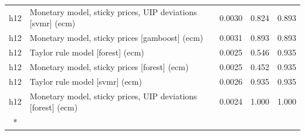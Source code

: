 \begin{ThreePartTable}
\begin{longtable}[t]{cp{5.5cm}ccc}
h12 & \raggedright Monetary model, sticky prices, UIP deviations [svmr] (ecm) & 0.0030 & 0.824 & 0.893\\
h12 & \raggedright Monetary model, sticky prices [gamboost] (ecm) & 0.0031 & 0.893 & 0.893\\
h12 & \raggedright Taylor rule model [forest] (ecm) & 0.0025 & 0.546 & 0.935\\
h12 & \raggedright Monetary model, sticky prices [forest] (ecm) & 0.0025 & 0.452 & 0.935\\
h12 & \raggedright Taylor rule model [svmr] (ecm) & 0.0026 & 0.935 & 0.935\\
h12 & \raggedright Monetary model, sticky prices, UIP deviations [forest] (ecm) & 0.0024 & 1.000 & 1.000\\*
\end{longtable}
\end{ThreePartTable}
\endgroup{}
